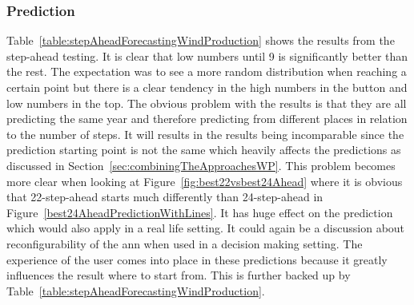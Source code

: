 \subsubsection{Prediction}
Table~\ref{table:stepAheadForecastingWindProduction} shows the results from the step-ahead testing. It is clear that low numbers until 9 is significantly better than the rest. The expectation was to see a more random distribution when reaching a certain point but there is a clear tendency in the high numbers in the button and low numbers in the top. The obvious problem with the results is that they are all predicting the same year and therefore predicting from different places in relation to the number of steps. It will results in the results being incomparable since the prediction starting point is not the same which heavily affects the predictions as discussed in Section~\ref{sec:combiningTheApproachesWP}. This problem becomes more clear when looking at Figure~\ref{fig:best22vsbest24Ahead} where it is obvious that 22-step-ahead starts much differently than 24-step-ahead in Figure~\ref{best24AheadPredictionWithLines}. It has huge effect on the prediction which would also apply in a real life setting. It could again be a discussion about reconfigurability of the ann when used in a decision making setting. The experience of the user comes into place in these predictions because it greatly influences the result where to start from. This is further backed up by Table~\ref{table:stepAheadForecastingWindProduction}.

